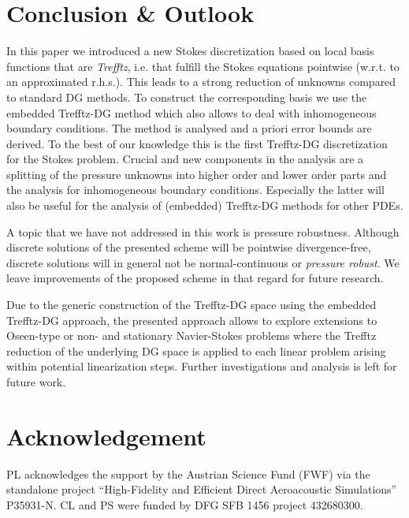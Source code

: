 \documentclass[pdflatex,sn-mathphys,Numbered]{sn-jnl}%
\theoremstyle{remark}%
\theoremstyle{definition}%
\begin{document}
\section{Conclusion \& Outlook}\label{sec13} In this paper we
introduced a new Stokes discretization based on local basis functions
that are \emph{Trefftz}, i.e. that fulfill the Stokes equations
pointwise (w.r.t. to an approximated r.h.s.). This leads to a strong
reduction of unknowns compared to standard DG methods. To construct
the corresponding basis we use the embedded Trefftz-DG method which
also allows to deal with inhomogeneous boundary conditions. The method
is analysed and a priori error bounds  are derived. To the best of our
knowledge this is the first Trefftz-DG discretization for the Stokes
problem. Crucial and new components in the analysis are a splitting of
the pressure unknowns into higher order and lower order parts and the
analysis for inhomogeneous boundary conditions. Especially the latter
will also be useful for the analysis of (embedded) Trefftz-DG methods
for other PDEs. 

A topic that we have not addressed in this work is pressure robustness. Although discrete solutions of the presented scheme will be pointwise divergence-free, discrete solutions will in general not be normal-continuous or \emph{pressure robust}. We leave improvements of the proposed scheme in that regard for future research.

Due to the generic construction of the Trefftz-DG space using the embedded Trefftz-DG approach, the presented approach allows to explore extensions to Oseen-type or non- and stationary Navier-Stokes problems where the Trefftz reduction of the underlying DG space is applied to each linear problem arising within potential linearization steps. Further investigations and analysis is left for future work.
\section{Acknowledgement}

PL acknowledges the support by the Austrian Science Fund (FWF) via the
standalone project “High-Fidelity and Efficient Direct Aeroacoustic
Simulations” P35931-N. CL and PS were funded by DFG SFB 1456 project 432680300.
\end{document}
